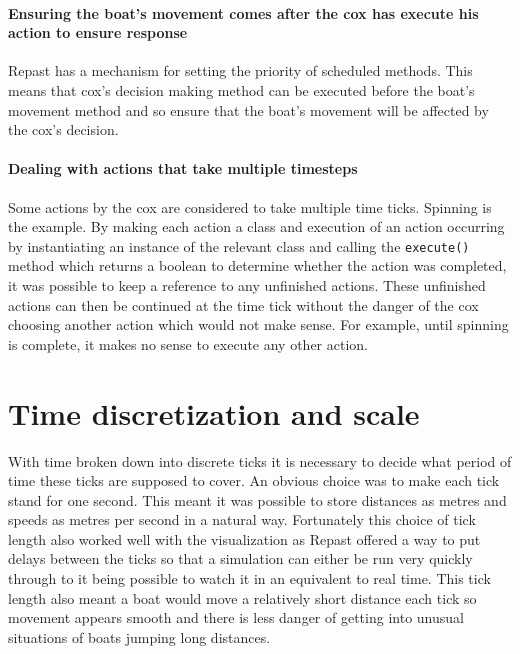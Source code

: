     \paragraph{Ensuring the boat's movement comes after the cox has execute his action to ensure response}
    Repast has a mechanism for setting the priority of scheduled methods. This means that cox's decision making method can be executed before the boat's movement method and so ensure that the boat's movement will be affected by the cox's decision.
    
    \paragraph{Dealing with actions that take multiple timesteps}
    Some actions by the cox are considered to take multiple time ticks. Spinning is the example. By making each action a class and execution of an action occurring by instantiating an instance of the relevant class and calling the \texttt{execute()} method which returns a boolean to determine whether the action was completed, it was possible to keep a reference to any unfinished actions. These unfinished actions can then be continued at the time tick without the danger of the cox choosing another action which would not make sense. For example, until spinning is complete, it makes no sense to execute any other action.
      
  \section{Time discretization and scale}
    With time broken down into discrete ticks it is necessary to decide what period of time these ticks are supposed to cover. An obvious choice was to make each tick stand for one second. This meant it was possible to store distances as metres and speeds as metres per second in a natural way. Fortunately this choice of tick length also worked well with the visualization as Repast offered a way to put delays between the ticks so that a simulation can either be run very quickly through to it being possible to watch it in an equivalent to real time. This tick length also meant a boat would move a relatively short distance each tick so movement appears smooth and there is less danger of getting into unusual situations of boats jumping long distances.
    
